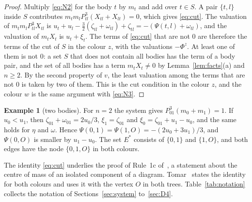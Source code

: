 \documentclass[11pt]{amsart}
\theoremstyle{definition}
\newtheorem{example}[theorem]{Example}
\theoremstyle{remark}
\numberwithin{equation}{section}
\newcommand{\Es}{E^{*}}
\begin{document}
\begin{proof}
Multiply \eqref{eq:N2} for the body $t$ by $m_t$ and add over $t \in S$. A pair $\{t, l\}$ inside $S$
contributes $m_t m_l P_{tl}^3 (X_{tl} + X_{lt}) = 0$, which gives \eqref{eq:cut}. The valuation of
$m_t m_l P_{tl}^3 X_{tl}$ is
$u_t + u_l - \tfrac32 (\zeta_{tl} + \omega_{tl}) + \zeta_{tl} = -(\Psi(t, l) + \omega_{tl})$, and the
valuation of $m_t X_t$ is $u_t + \xi_t$. The terms of \eqref{eq:cut} that are not $0$ are therefore the
terms of the cut of $S$ in the colour $z$, with the valuations $-\Phi^z$. At least one of them is not
$0$: a set $S$ that does not contain all bodies has the term of a body pair, and the set of all bodies
has a term $m_t X_t \ne 0$ by Lemma~\ref{lem:facts}(a) and $n \ge 2$. By the second property of $v$, the
least valuation among the terms that are not $0$ is taken by two of them. This is the cut condition in
the colour $z$, and the colour $w$ is the same argument with \eqref{eq:N3}.
\end{proof}

\begin{example}[two bodies]\label{ex:n2}
For $n = 2$ the system gives $P_{01}^3 (m_0 + m_1) = 1$. If $u_0 < u_1$, then
$\zeta_{01} + \omega_{01} = 2u_0/3$, $\xi_1 = \zeta_{01}$ and $\xi_0 = \zeta_{01} + u_1 - u_0$, and the
same holds for $\eta$ and $\omega$. Hence $\Psi(0, 1) = \Psi(1, O) = -(2u_0 + 3u_1)/3$, and
$\Psi(0, O)$ is smaller by $u_1 - u_0$. The set $\Es$ consists of $\{0, 1\}$ and $\{1, O\}$, and both
edges have the node $\{0, 1, O\}$ in both colours.
\end{example}

The identity \eqref{eq:cut} underlies the proof of Rule~1c of~\cite[p.~546]{albouykaloshin2012}, a
statement about the centre of mass of an isolated component of a diagram.
Tomar~\cite[\S 2.3, \S 4.1 and \S 9.1]{tomar6} states the identity for both colours and uses it with the
vertex $O$ in both trees. Table~\ref{tab:notation} collects the notation of Sections~\ref{sec:system}
to~\ref{sec:D4}.
\end{document}
